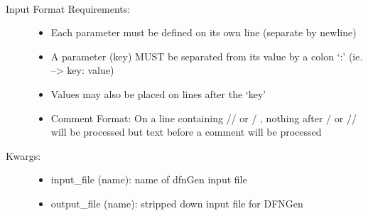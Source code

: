 \documentclass[letterpaper,10pt,english]{sphinxmanual}
\begin{document}
\begin{fulllineitems}
\label{pydfnworks:pydfnworks.gen_input.check_input}~\begin{description}
\item[{Input Format Requirements:  }] \leavevmode\begin{itemize}
\item {} 
Each parameter must be defined on its own line (separate by newline)

\item {} 
A parameter (key) MUST be separated from its value by a colon `:' (ie. --\textgreater{} key: value)

\item {} 
Values may also be placed on lines after the `key'

\item {} 
Comment Format:  On a line containing  // or / \code{*}, nothing after \code{*} / or // will be processed  but text before a comment will be processed

\end{itemize}

\item[{Kwargs:}] \leavevmode\begin{itemize}
\item {} 
input\_file (name): name of dfnGen input file

\item {} 
output\_file (name): stripped down input file for DFNGen

\end{itemize}

\end{description}

\end{fulllineitems}

\label{pydfnworks:module-pydfnworks.distributions}
\end{document}

